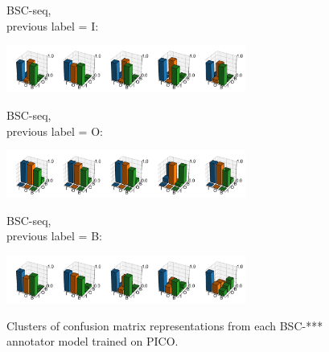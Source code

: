 \begin{figure}[h]
\begin{minipage}[b][1cm][l]{0.2\textwidth} 
BSC-seq, \\
previous label = I:
\end{minipage}
  \includegraphics[width=0.7\textwidth, clip=True, trim=20 16 0 28]{figures/worker_models/seq_prev0}
\\
\begin{minipage}[b][1cm][l]{0.2\textwidth} 
BSC-seq, \\
previous label = O:
\end{minipage}
  \includegraphics[width=0.7\textwidth, clip=True, trim=20 16 0 28]{figures/worker_models/seq_prev1}
\\
\begin{minipage}[b][1cm][l]{0.2\textwidth} 
BSC-seq,\\
 previous label = B:
\end{minipage}
  \includegraphics[width=0.7\textwidth, clip=True, trim=20 17 0 28]{figures/worker_models/seq_prev2}
\\
\caption{Clusters of confusion matrix representations from each BSC-*** annotator model trained on PICO. 
}
\label{fig:conf_mat_clusters}
\end{figure}

